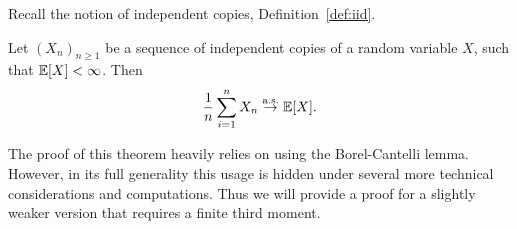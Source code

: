 %
%
%
%
%


Recall the notion of independent copies, Definition~\ref{def:iid}.

\begin{theorem}\label{thm:slln}
Let $(X_n)_{n \ge 1}$ be a sequence of independent copies of a random variable $X$, such that $\mathbb E[X] < \infty$. Then
\[
	\frac{1}{n} \sum_{i = 1}^n X_n \stackrel{\mathrm{a.s.}}{\rightarrow} \mathbb E[X].
\]
\end{theorem}

The proof of this theorem heavily relies on using the Borel-Cantelli lemma. However, in its full generality this usage is hidden under several more technical considerations and computations. Thus we will provide a proof for a slightly weaker version that requires a finite third moment.

